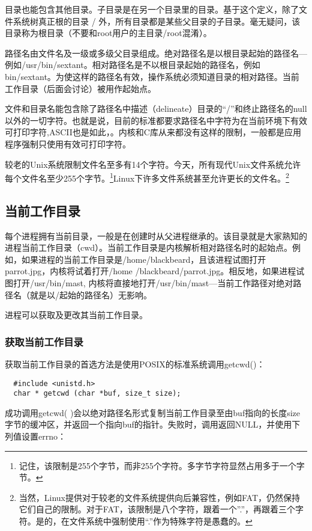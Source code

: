 目录也能包含其他目录。子目录是在另一个目录里的目录。基于这个定义，除了文件系统树真正根的目录 / 外，所有目录都是某些父目录的子目录。毫无疑问，该目录称为根目录（不要和root用户的主目录/root混淆）。

路径名由文件名及一级或多级父目录组成。绝对路径名是以根目录起始的路径名—例如/usr/bin/sextant。相对路径名是不以根目录起始的路径名，例如bin/sextant。为使这样的路径名有效，操作系统必须知道目录的相对路径。当前工作目录（后面会讨论）被用作起始点。 

文件和目录名能包含除了路径名中描述（delineate）目录的“/”和终止路径名的null以外的一切字符。也就是说，目前的标准都要求路径名中字符为在当前环境下有效可打印字符,ASCII也是如此，。内核和C库从来都没有这样的限制，一般都是应用程序强制只使用有效可打印字符。

较老的Unix系统限制文件名至多有14个字符。今天，所有现代Unix文件系统允许每个文件名至少255个字节。\footnote[1]{记住，该限制是255个字节，而非255个字符。多字节字符显然占用多于一个字节。}Linux下许多文件系统甚至允许更长的文件名。\footnote[2]{当然，Linux提供对于较老的文件系统提供向后兼容性，例如FAT，仍然保持它们自己的限制。对于FAT，该限制是八个字符，跟着一个''.''，再跟着三个字符。是的，在文件系统中强制使用“.”作为特殊字符是愚蠢的。}

\subsection{当前工作目录}

每个进程拥有当前目录，一般是在创建时从父进程继承的。该目录就是大家熟知的进程当前工作目录（cwd）。当前工作目录是内核解析相对路径名时的起始点。例如，如果进程的当前工作目录是/home/blackbeard，且该进程试图打开parrot.jpg，内核将试着打开/home /blackbeard/parrot.jpg。相反地，如果进程试图打开/usr/bin/mast, 内核将直接地打开/usr/bin/mast—当前工作路径对绝对路径名（就是以/起始的路径名）无影响。

进程可以获取及更改其当前工作目录。

\subsubsection{获取当前工作目录}

获取当前工作目录的首选方法是使用POSIX的标准系统调用getcwd()：

\begin{lstlisting}
  #include <unistd.h>
  char * getcwd (char *buf, size_t size);
\end{lstlisting}

成功调用getcwd( )会以绝对路径名形式复制当前工作目录至由buf指向的长度size字节的缓冲区，并返回一个指向buf的指针。失败时，调用返回NULL，并使用下列值设置errno：

